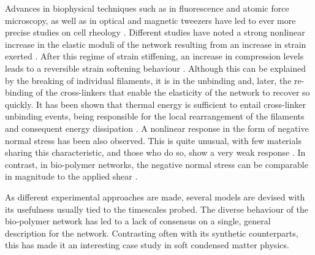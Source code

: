 \documentclass[../../main.tex]{subfiles}
\begin{document}
    Advances in biophysical techniques such as in fluorescence and atomic force microscopy, as well as in optical and magnetic tweezers have led to ever more precise studies on cell rheology \cite{mohammedInnovativeToolsMechanobiology2019, kollmannsbergerHighforceMagneticTweezers2007, masQuantitativeDeterminationOptical2013}. Different studies have noted a strong nonlinear increase in the elastic moduli of the network resulting from an increase in strain exerted \cite{linOriginsElasticityIntermediate2010, schopfererDesminVimentinIntermediate2009, gardelElasticBehaviorCrossLinked2004, piechockaMultiscaleStrainstiffeningSemiflexible2016, gardelStressDependentElasticityComposite2006, kangNonlinearElasticityStiff2009, koenderinkActiveBiopolymerNetwork2009}. After this regime of strain stiffening, an increase in compression levels leads to a reversible strain softening behaviour \cite{leeMolecularOriginStrain2010, chaudhuriReversibleStressSoftening2007}. Although this can be explained by the breaking of individual filaments, it is in the unbinding and, later, the re-binding of the cross-linkers that enable the elasticity of the network to recover so quickly. It has been shown that thermal energy is sufficient to entail cross-linker unbinding events, being responsible for the local rearrangement of the filaments and consequent energy dissipation \cite{lielegCytoskeletalPolymerNetworks2009, gardelStressDependentElasticityComposite2006, gardelElasticBehaviorCrossLinked2004, tharmannViscoelasticityIsotropicallyCrossLinked2007, semmrichNonlinearMechanicsEntangled2008, lielegTransientBindingDissipation2008, xuStrainHardeningStrain2011}. A nonlinear response in the form of negative normal stress has been also observed. This is quite unusual, with few materials sharing this characteristic, and those who do so, show a very weak response \cite{lin-gibsonElasticFlowInstability2004, montesiVorticityAlignmentNegative2004, ciferriLiquidCrystallinityPolymers1991}. In contrast, in bio-polymer networks, the negative normal stress can be comparable in magnitude to the applied shear \cite{contiCrossLinkedNetworksStiff2009}.

    As different experimental approaches are made, several models are devised with its usefulness usually tied to the timescales probed. The diverse behaviour of the bio-polymer network has led to a lack of consensus on a single, general description for the network. Contrasting often with its synthetic counterparts, this has made it an interesting case study in soft condensed matter physics. 
    
\end{document}
